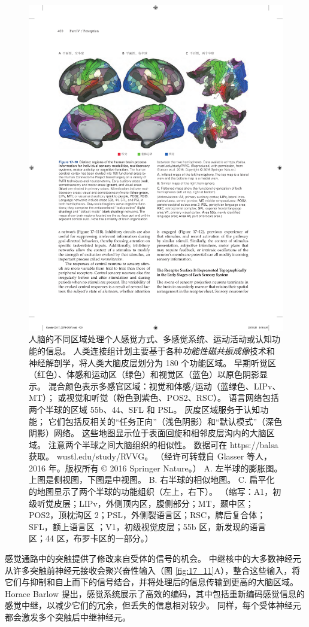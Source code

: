 \begin{figure}[htbp]
	\centering
	\includegraphics[width=0.7\linewidth]{chap17/fig_17_10}
	\caption{人脑的不同区域处理个人感觉方式、多感觉系统、运动活动或认知功能的信息。
		人类连接组计划主要基于各种\textit{功能性磁共振成像}技术和神经解剖学，将人类大脑皮层划分为 180 个功能区域。 
		早期听觉区（红色）、体感和运动区（绿色）和视觉区（蓝色）以原色阴影显示。 
		混合颜色表示多感官区域：视觉和体感/运动（蓝绿色、LIPv、MT）； 或视觉和听觉（粉色到紫色、POS2、RSC）。 
		语言网络包括两个半球的区域 55b、44、SFL 和 PSL。 
		灰度区域服务于认知功能； 它们包括反相关的“任务正向”（浅色阴影）和“默认模式”（深色阴影）网络。 
		这些地图显示位于表面回旋和相邻皮层沟内的大脑区域。 
		注意两个半球之间大脑组织的相似性。 数据可在 https://balsa 获取。 wustl.edu/study/RVVG。 （经许可转载自 Glasser 等人，2016 年。版权所有 © 2016 Springer Nature。）
		A. 左半球的膨胀图。 上图是侧视图，下图是中视图。 
		B. 右半球的相似地图。 
		C. 扁平化的地图显示了两个半球的功能组织（左上，右下）。 
		（缩写：A1，初级听觉皮层；LIPv，外侧顶内区，腹侧部分；MT，颞中区；POS2，顶枕沟区 2；PSL，外侧裂语言区；RSC，脾后复合体；SFL，额上语言区 ；V1，初级视觉皮层；55b 区，新发现的语言区；44 区，布罗卡区的一部分。）}
	\label{fig:17_10}
\end{figure}

感觉通路中的突触提供了修改来自受体的信号的机会。 
中继核中的大多数神经元从许多突触前神经元接收会聚兴奋性输入（图 \ref{fig:17_11}A），整合这些输入，将它们与抑制和自上而下的信号结合，并将处理后的信息传输到更高的大脑区域。 
Horace Barlow 提出，感觉系统展示了高效的编码，其中包括重新编码感觉信息的感觉中继，以减少它们的冗余，但丢失的信息相对较少。 
同样，每个受体神经元都会激发多个突触后中继神经元。

